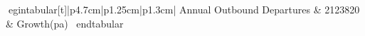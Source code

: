  egin{tabular}[t]{|p{4.7cm}|p{1.25cm}|p{1.3cm}|}
                            Annual Outbound Departures & 2123820 & Growth(pa) \   end{tabular}